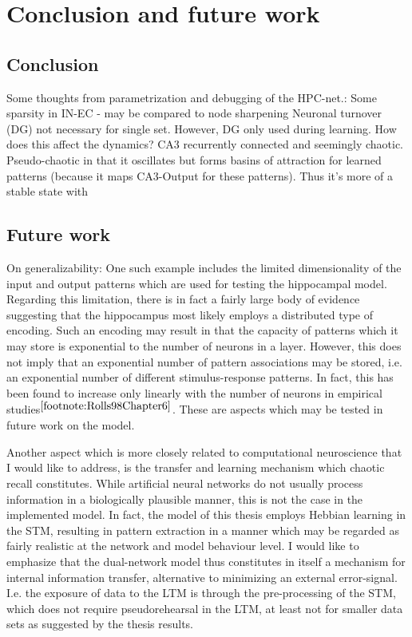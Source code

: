 
\chapter{Conclusion and future work}\label{chpt:conclusion}

\section{Conclusion}

Some thoughts from parametrization and debugging of the HPC-net.:
Some sparsity in IN-EC - may be compared to node sharpening
Neuronal turnover (DG) not necessary for single set. However, DG only used during learning. How does this affect the dynamics?
CA3 recurrently connected and seemingly chaotic. Pseudo-chaotic in that it oscillates but forms basins of attraction for learned patterns (because it maps CA3-Output for these patterns). Thus it’s more of a stable state with 



\section{Future work}

On generalizability: One such example includes the limited dimensionality of the input and output patterns which are used for testing the hippocampal model. Regarding this limitation, there is in fact a fairly large body of evidence suggesting that the hippocampus most likely employs a distributed type of encoding. Such an encoding may result in that the capacity of patterns which it may store is exponential to the number of neurons in a layer.
However, this does not imply that an exponential number of pattern associations may be stored, i.e. an exponential number of different stimulus-response patterns. In fact, this has been found to increase only linearly with the number of neurons in empirical studies$^{\ref{footnote:Rolls98Chapter6}}$. These are aspects which may be tested in future work on the model.

Another aspect which is more closely related to computational neuroscience that I would like to address, is the transfer and learning mechanism which chaotic recall constitutes.
While artificial neural networks do not usually process information in a biologically plausible manner, this is not the case in the implemented model. In fact, the model of this thesis employs Hebbian learning in the STM, resulting in pattern extraction in a manner which may be regarded as fairly realistic at the network and model behaviour level.
I would like to emphasize that the dual-network model thus constitutes in itself a mechanism for internal information transfer, alternative to minimizing an external error-signal. I.e. the exposure of data to the LTM is through the pre-processing of the STM, which does not require pseudorehearsal in the LTM, at least not for smaller data sets as suggested by the thesis results.

